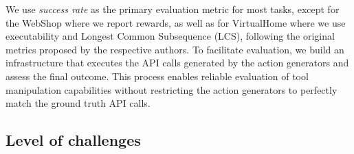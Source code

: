 We use \emph{success rate} as the primary evaluation metric for most tasks, except for the WebShop where we report rewards, as well as for VirtualHome where we use executability and Longest Common Subsequence (LCS), following the original metrics proposed by the respective authors. To facilitate evaluation, we build an infrastructure that executes the API calls generated by the action generators and assess the final outcome. This process enables reliable evaluation of tool manipulation capabilities without restricting the action generators to perfectly match the ground truth API calls. 



\subsection{Level of challenges}


